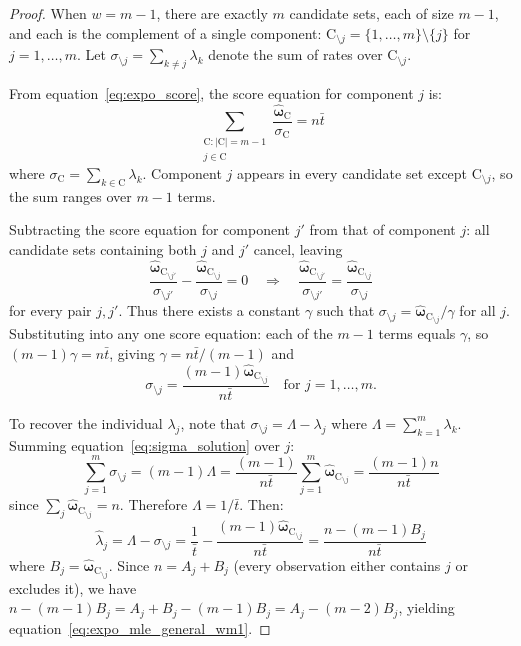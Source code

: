 \documentclass[12pt]{article}
\newcommand{\RV}[1]{\mathrm{#1}}
\newcommand{\cand}{\RV{C}}         %
\newcommand{\estimator}[1]{\hat{#1}}   %
\newcommand{\cntsymb}{\boldsymbol{\hat\omega}}
\theoremstyle{definition}
\theoremstyle{remark}
\begin{document}
\begin{proof}
When $w = m-1$, there are exactly $m$ candidate sets, each of size $m-1$, and each is the complement of a single component: $\cand_{\setminus j} = \{1,\ldots,m\} \setminus \{j\}$ for $j = 1, \ldots, m$. Let $\sigma_{\setminus j} = \sum_{k \neq j} \lambda_k$ denote the sum of rates over $\cand_{\setminus j}$.

From equation~\eqref{eq:expo_score}, the score equation for component $j$ is:
\begin{equation}
\label{eq:score_general}
\sum_{\substack{\cand : |\cand| = m-1 \\ j \in \cand}} \frac{\cntsymb_{\cand}}{\sigma_{\cand}} = n\bar{t}
\end{equation}
where $\sigma_{\cand} = \sum_{k \in \cand} \lambda_k$. Component $j$ appears in every candidate set except $\cand_{\setminus j}$, so the sum ranges over $m-1$ terms.

Subtracting the score equation for component $j'$ from that of component $j$: all candidate sets containing both $j$ and $j'$ cancel, leaving
\begin{equation}
\frac{\cntsymb_{\cand_{\setminus j'}}}{\sigma_{\setminus j'}} - \frac{\cntsymb_{\cand_{\setminus j}}}{\sigma_{\setminus j}} = 0 \quad \Rightarrow \quad \frac{\cntsymb_{\cand_{\setminus j'}}}{\sigma_{\setminus j'}} = \frac{\cntsymb_{\cand_{\setminus j}}}{\sigma_{\setminus j}}
\end{equation}
for every pair $j, j'$. Thus there exists a constant $\gamma$ such that $\sigma_{\setminus j} = \cntsymb_{\cand_{\setminus j}} / \gamma$ for all $j$. Substituting into any one score equation: each of the $m-1$ terms equals $\gamma$, so $(m-1)\gamma = n\bar{t}$, giving $\gamma = n\bar{t}/(m-1)$ and
\begin{equation}
\label{eq:sigma_solution}
\sigma_{\setminus j} = \frac{(m-1)\cntsymb_{\cand_{\setminus j}}}{n\bar{t}} \quad \text{for } j = 1, \ldots, m.
\end{equation}

To recover the individual $\lambda_j$, note that $\sigma_{\setminus j} = \Lambda - \lambda_j$ where $\Lambda = \sum_{k=1}^m \lambda_k$. Summing equation~\eqref{eq:sigma_solution} over $j$:
\begin{equation}
\sum_{j=1}^m \sigma_{\setminus j} = (m-1)\Lambda = \frac{(m-1)}{n\bar{t}} \sum_{j=1}^m \cntsymb_{\cand_{\setminus j}} = \frac{(m-1)n}{n\bar{t}}
\end{equation}
since $\sum_j \cntsymb_{\cand_{\setminus j}} = n$. Therefore $\Lambda = 1/\bar{t}$. Then:
\begin{equation}
\estimator{\lambda}_j = \Lambda - \sigma_{\setminus j} = \frac{1}{\bar{t}} - \frac{(m-1)\cntsymb_{\cand_{\setminus j}}}{n\bar{t}} = \frac{n - (m-1)B_j}{n\bar{t}}
\end{equation}
where $B_j = \cntsymb_{\cand_{\setminus j}}$. Since $n = A_j + B_j$ (every observation either contains $j$ or excludes it), we have $n - (m-1)B_j = A_j + B_j - (m-1)B_j = A_j - (m-2)B_j$, yielding equation~\eqref{eq:expo_mle_general_wm1}.
\end{proof}
\end{document}
